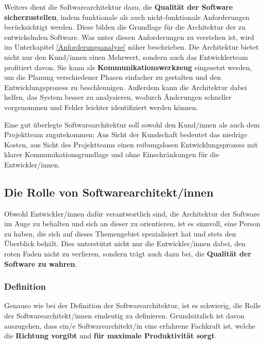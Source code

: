 Weiters dient die Softwarearchitektur dazu, die \textbf{Qualität der Software sicherzustellen}, indem funktionale als auch nicht-funktionale Anforderungen berücksichtigt werden. Diese bilden die Grundlage für die Architektur der zu entwickelnden Software.
Was unter diesen Anforderungen zu verstehen ist, wird im Unterkapitel \ref{Anforderungsanalyse} näher beschrieben.
Die Architektur bietet nicht nur den Kund/innen einen Mehrwert, sondern auch das Entwicklerteam profitiert davon.
Sie kann als \textbf{Kommunikationswerkzeug} eingesetzt werden, um die Planung verschiedener Phasen einfacher zu gestalten und den Entwicklungsprozess zu beschleunigen. Außerdem kann die Architektur dabei helfen, das System besser zu analysieren, wodurch Änderungen schneller vorgenommen und Fehler leichter identifiziert werden können.
\cite{EA:Web02}

Eine gut überlegte Softwarearchitektur soll sowohl den Kund/innen als auch dem Projektteam zugutekommen: 
Aus Sicht der Kundschaft bedeutet das niedrige Kosten, aus Sicht des Projektteams einen reibungslosen Entwicklungsprozess mit klarer Kommunikationsgrundlage und ohne Einschränkungen für die Entwickler/innen.



\subsection{Die Rolle von Softwarearchitekt/innen} \label{Die Rolle von Softwarearchitekt/innen}

Obwohl Entwickler/innen dafür verantwortlich sind, die Architektur der Software im Auge zu behalten und sich an dieser zu orientieren, ist es sinnvoll, eine Person zu haben, die sich auf dieses Themengebiet spezialisiert hat und stets den Überblick behält. Dies unterstützt nicht nur die Entwickler/innen dabei, den roten Faden nicht zu verlieren, sondern trägt auch dazu bei, die \textbf{Qualität der Software zu wahren}.

    \subsubsection{Definition}

    Genauso wie bei der Definition der Softwarearchitektur, ist es schwierig, die Rolle der Softwarearchitekt/innen eindeutig zu definieren. Grundsätzlich ist davon auszugehen, dass ein/e Softwarearchitekt/in eine erfahrene Fachkraft ist, welche die \textbf{Richtung vorgibt} und \textbf{für maximale Produktivität sorgt}. \\
    \cite[S. 136-137]{EA:Book01} \cite[S. 7-8]{EA:Book02}

